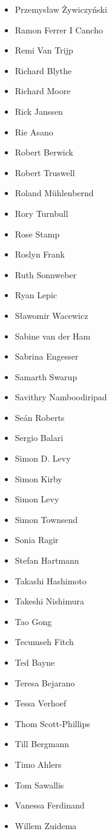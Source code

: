 \begin{multicols}{3}
\begin{itemize}[label={},leftmargin=*]
\item Przemys\l{}aw \.{Z}ywiczy\'{n}ski
\item Ramon Ferrer I Cancho
\item Remi Van Trijp
\item Richard Blythe
\item Richard Moore
\item Rick Janssen
\item Rie Asano
\item Robert Berwick
\item Robert Truswell
\item Roland M\"uhlenbernd
\item Rory Turnbull
\item Rose Stamp
\item Roslyn Frank
\item Ruth Sonnweber
\item Ryan Lepic
\item S\l{}awomir Wacewicz
\item Sabine van der Ham
\item Sabrina Engesser
\item Samarth Swarup
\item Savithry Namboodiripad
\item Se\'an Roberts
\item Sergio Balari
\item Simon D. Levy
\item Simon Kirby
\item Simon Levy
\item Simon Townsend
\item Sonia Ragir
\item Stefan Hartmann
\item Takashi Hashimoto
\item Takeshi Nishimura
\item Tao Gong
\item Tecumseh Fitch
\item Ted Bayne
\item Teresa Bejarano
\item Tessa Verhoef
\item Thom Scott-Phillips
\item Till Bergmann
\item Timo Ahlers
\item Tom Sawallis
\item Vanessa Ferdinand
\item Willem Zuidema

\end{itemize}
\end{multicols}
